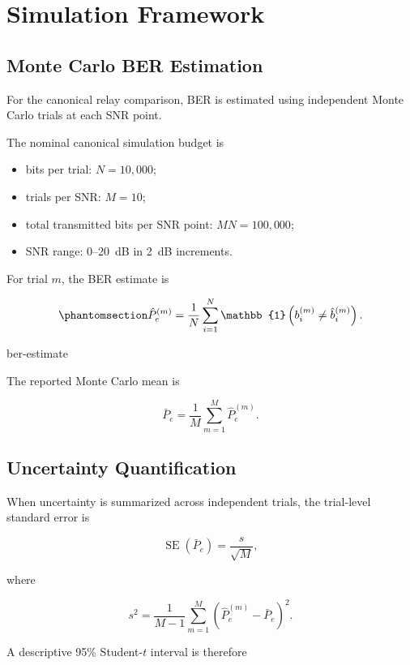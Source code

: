 \section{Simulation Framework}\label{sec:simulation-framework}

\subsection{Monte Carlo BER Estimation}
\label{sec:monte-carlo-ber-estimation}

For the canonical relay comparison, BER is estimated using independent
Monte Carlo trials at each SNR point.

The nominal canonical simulation budget is

\begin{itemize}
    \item bits per trial: $N=10{,}000$;
    \item trials per SNR: $M=10$;
    \item total transmitted bits per SNR point: $MN=100{,}000$;
    \item SNR range: 0--20~dB in 2~dB increments.
\end{itemize}

For trial $m$, the BER estimate is

\begin{equation}\protect\phantomsection\label{eq:ber-estimate}
\hat P_e^{(m)}
=
\frac{1}{N}
\sum_{i=1}^{N}
\mathbb{1}
\left(
b_i^{(m)}
\neq
\hat b_i^{(m)}
\right).
\end{equation}
{\protect\numberline{\theequation}\quad ber-estimate}

The reported Monte Carlo mean is

\[
\bar P_e
=
\frac{1}{M}
\sum_{m=1}^{M}
\hat P_e^{(m)}.
\]


\subsection{Uncertainty Quantification}

When uncertainty is summarized across independent trials, the
trial-level standard error is

\[
\operatorname{SE}(\bar P_e)
=
\frac{s}{\sqrt M},
\]

where

\[
s^2
=
\frac{1}{M-1}
\sum_{m=1}^{M}
\left(
\hat P_e^{(m)}-\bar P_e
\right)^2.
\]

A descriptive 95\% Student-$t$ interval is therefore

